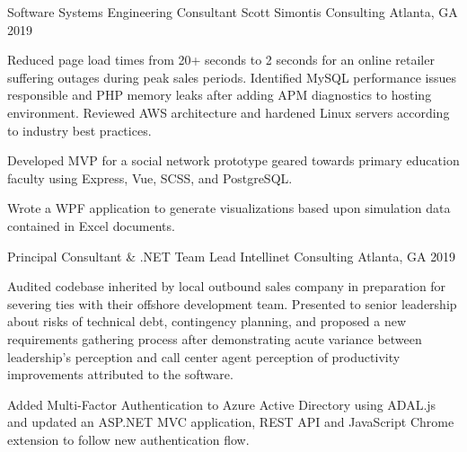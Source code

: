 \begin{cventries}
  \cventry
    {Software Systems Engineering Consultant} %
    {Scott Simontis Consulting} %
    {Atlanta, GA} %
    {2019} %
    {
      \begin{cvitems} %
        \item {Reduced page load times from 20+ seconds to 2 seconds for an online retailer suffering outages during peak sales periods. Identified MySQL performance issues responsible and PHP memory leaks after adding APM diagnostics to hosting environment. Reviewed AWS architecture and hardened Linux servers according to industry best practices.}
        \item {Developed MVP for a social network prototype geared towards primary education faculty using Express, Vue, SCSS, and PostgreSQL.}
        \item {Wrote a WPF application to generate visualizations based upon simulation data contained in Excel documents.}
      \end{cvitems}
    }

  \cventry
    {Principal Consultant \& .NET Team Lead} %
    {Intellinet Consulting} %
    {Atlanta, GA} %
    {2019} %
    {
      \begin{cvitems} %
        \item {Audited codebase inherited by local outbound sales company in preparation for severing ties with their offshore development team. Presented to senior leadership about risks of technical debt, contingency planning, and proposed a new requirements gathering process after demonstrating acute variance between leadership’s perception and call center agent perception of productivity improvements attributed to the software.}
        \item {Added Multi-Factor Authentication to Azure Active Directory using ADAL.js and updated an ASP.NET MVC application, REST API and JavaScript Chrome extension to follow new authentication flow.}
      \end{cvitems}
    }


\end{cventries}
